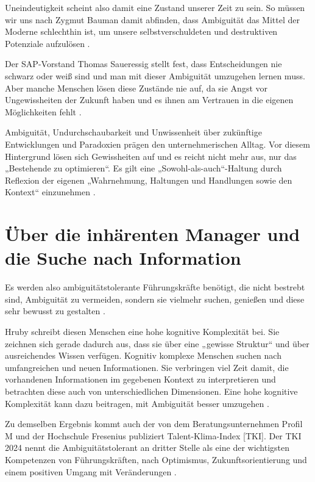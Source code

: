 \documentclass[
  ngerman,
  letterpaper,
  DIV=11]{scrartcl}
\begin{document}
Uneindeutigkeit scheint also damit eine Zustand unserer Zeit zu sein. So
müssen wir uns nach Zygmut Bauman damit abfinden, dass Ambiguität das
Mittel der Moderne schlechthin ist, um unsere selbstverschuldeten und
destruktiven Potenziale aufzulösen \autocite{bauman2016}.

Der SAP-Vorstand Thomas Saueressig stellt fest, dass Entscheidungen nie
schwarz oder weiß sind und man mit dieser Ambiguität umzugehen lernen
muss. \autocite{witte2024} Aber manche Menschen lösen diese Zustände nie
auf, da sie Angst vor Ungewissheiten der Zukunft haben und es ihnen am
Vertrauen in die eigenen Möglichkeiten fehlt
\autocite[15]{morschitzky2009}.

Ambiguität, Undurchschaubarkeit und Unwissenheit über zukünftige
Entwicklungen und Paradoxien prägen den unternehmerischen Alltag. Vor
diesem Hintergrund lösen sich Gewissheiten auf und es reicht nicht mehr
aus, nur das „Bestehende zu optimieren``. Es gilt eine
„Sowohl-als-auch``-Haltung durch Reflexion der eigenen „Wahrnehmung,
Haltungen und Handlungen sowie den Kontext`` einzunehmen
\autocite{kozica2025}.

\section{Über die inhärenten Manager und die Suche nach
Information}\label{uxfcber-die-inhuxe4renten-manager-und-die-suche-nach-information}

Es werden also ambiguitätstolerante Führungskräfte benötigt, die nicht
bestrebt sind, Ambiguität zu vermeiden, sondern sie vielmehr suchen,
genießen und diese sehr bewusst zu gestalten \autocite[90]{bauer2018}.

Hruby schreibt diesen Menschen eine hohe kognitive Komplexität bei. Sie
zeichnen sich gerade dadurch aus, dass sie über eine „gewisse Struktur``
und über ausreichendes Wissen verfügen. Kognitiv komplexe Menschen
suchen nach umfangreichen und neuen Informationen. Sie verbringen viel
Zeit damit, die vorhandenen Informationen im gegebenen Kontext zu
interpretieren und betrachten diese auch von unterschiedlichen
Dimensionen. Eine hohe kognitive Komplexität kann dazu beitragen, mit
Ambiguität besser umzugehen \autocite[5]{hruby2014}.

Zu demselben Ergebnis kommt auch der von dem Beratungsunternehmen Profil
M und der Hochschule Fresenius publiziert Talent-Klima-Index {[}TKI{]}.
Der TKI 2024 nennt die Ambiguitätstolerant an dritter Stelle als eine
der wichtigsten Kompetenzen von Führungskräften, nach Optimismus,
Zukunftsorientierung und einem positiven Umgang mit Veränderungen
\autocite{stulle2024}.
\end{document}
